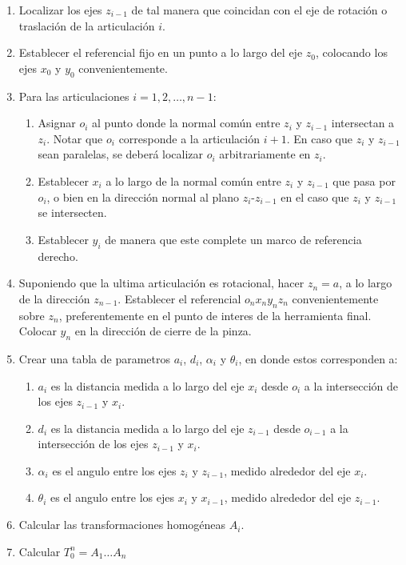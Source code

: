 \begin{multicols*}{3}
            \begin{enumerate}
                \item Localizar los ejes $z_{i-1}$ de tal manera que coincidan con el eje de rotación o traslación de la articulación $i$.
                \item Establecer el referencial fijo en un punto a lo largo del eje $z_0$, colocando los ejes $x_0$ y $y_0$ convenientemente.
                \item Para las articulaciones $i = 1, 2, \dots, n-1$:
                \begin{enumerate}
                    \item Asignar $o_i$ al punto donde la normal común entre $z_i$ y $z_{i-1}$ intersectan a $z_i$. Notar que $o_i$ corresponde a la articulación $i+1$. En caso que $z_i$ y $z_{i-1}$ sean paralelas, se deberá localizar $o_i$ arbitrariamente en $z_i$.
                    \item Establecer $x_i$ a lo largo de la normal común entre $z_i$ y $z_{i-1}$ que pasa por $o_i$, o bien en la dirección normal al plano $z_i$-$z_{i-1}$ en el caso que $z_i$ y $z_{i-1}$ se intersecten.
                    \item Establecer $y_i$ de manera que este complete un marco de referencia derecho.
                \end{enumerate}
                \item Suponiendo que la ultima articulación es rotacional, hacer $z_n = a$, a lo largo de la dirección $z_{n-1}$. Establecer el referencial $o_n x_n y_n z_n$ convenientemente sobre $z_n$, preferentemente en el punto de interes de la herramienta final. Colocar $y_n$ en la dirección de cierre de la pinza.
                \item Crear una tabla de parametros $a_i$, $d_i$, $\alpha_i$ y $\theta_i$, en donde estos corresponden a:
                \begin{enumerate}
                    \item $a_i$ es la distancia medida a lo largo del eje $x_i$ desde $o_i$ a la intersección de los ejes $z_{i-1}$ y $x_i$.
                    \item $d_i$ es la distancia medida a lo largo del eje $z_{i-1}$ desde $o_{i-1}$ a la intersección de los ejes $z_{i-1}$ y $x_i$.
                    \item $\alpha_i$ es el angulo entre los ejes $z_i$ y $z_{i-1}$, medido alrededor del eje $x_i$.
                    \item $\theta_i$ es el angulo entre los ejes $x_i$ y $x_{i-1}$, medido alrededor del eje $z_{i-1}$.
                \end{enumerate}
                \item Calcular las transformaciones homogéneas $A_i$.
                \item Calcular $T_0^n = A_1 \dots A_n$
            \end{enumerate}


\end{multicols*}
